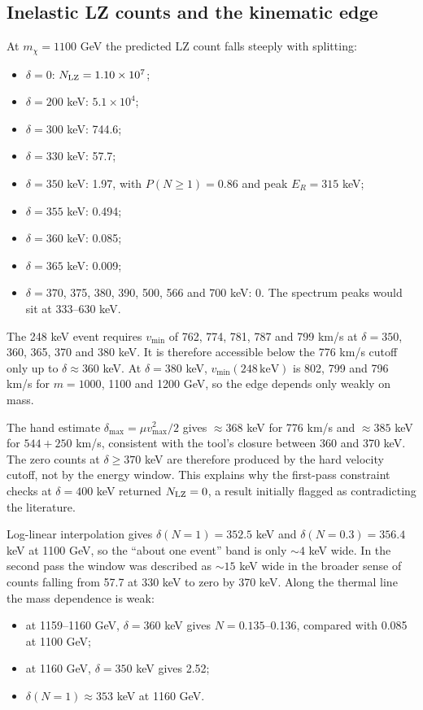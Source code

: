 \documentclass[11pt,a4paper]{article}
\begin{document}
\subsection{Inelastic LZ counts and the kinematic edge}
At $m_\chi=1100$ GeV the predicted LZ count falls steeply with splitting:
\begin{itemize}
\item $\delta=0$: $N_{\rm LZ}=1.10\times10^7$;
\item $\delta=200$ keV: $5.1\times10^4$;
\item $\delta=300$ keV: 744.6;
\item $\delta=330$ keV: 57.7;
\item $\delta=350$ keV: 1.97, with $P(N\ge1)=0.86$ and peak $E_R=315$ keV;
\item $\delta=355$ keV: 0.494;
\item $\delta=360$ keV: 0.085;
\item $\delta=365$ keV: 0.009;
\item $\delta=370$, 375, 380, 390, 500, 566 and 700 keV: 0. The spectrum peaks would sit at 333--630 keV.
\end{itemize}

The 248 keV event requires $v_{\min}$ of 762, 774, 781, 787 and 799 km/s at $\delta=350$, 360, 365, 370 and 380 keV. It is therefore accessible below the 776 km/s cutoff only up to $\delta\approx360$ keV. At $\delta=380$ keV, $v_{\min}(248\,\mathrm{keV})$ is 802, 799 and 796 km/s for $m=1000$, 1100 and 1200 GeV, so the edge depends only weakly on mass.

The hand estimate $\delta_{\max}=\mu v_{\max}^2/2$ gives $\approx368$ keV for 776 km/s and $\approx385$ keV for $544+250$ km/s, consistent with the tool's closure between 360 and 370 keV. The zero counts at $\delta\ge370$ keV are therefore produced by the hard velocity cutoff, not by the energy window. This explains why the first-pass constraint checks at $\delta=400$ keV returned $N_{\rm LZ}=0$, a result initially flagged as contradicting the literature.

Log-linear interpolation gives $\delta(N=1)=352.5$ keV and $\delta(N=0.3)=356.4$ keV at 1100 GeV, so the ``about one event'' band is only $\sim4$ keV wide. In the second pass the window was described as $\sim15$ keV wide in the broader sense of counts falling from 57.7 at 330 keV to zero by 370 keV. Along the thermal line the mass dependence is weak:
\begin{itemize}
\item at 1159--1160 GeV, $\delta=360$ keV gives $N=0.135$--0.136, compared with 0.085 at 1100 GeV;
\item at 1160 GeV, $\delta=350$ keV gives 2.52;
\item $\delta(N=1)\approx353$ keV at 1160 GeV.
\end{itemize}
\end{document}
